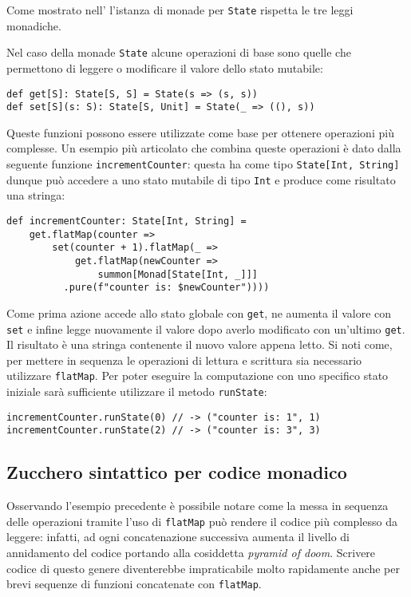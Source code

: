 Come mostrato nell' l'istanza di monade per \lstinline{State} rispetta le tre leggi monadiche.

Nel caso della monade \lstinline{State} alcune operazioni di base sono quelle che permettono di leggere o modificare il valore dello stato mutabile:
\begin{lstlisting}[language=scala3]
def get[S]: State[S, S] = State(s => (s, s))  
def set[S](s: S): State[S, Unit] = State(_ => ((), s))
\end{lstlisting}
Queste funzioni possono essere utilizzate come base per ottenere operazioni più complesse. Un esempio più articolato che combina queste operazioni è dato dalla seguente funzione \lstinline{incrementCounter}: questa ha come tipo \lstinline{State[Int, String]} dunque può accedere a uno stato mutabile di tipo \lstinline{Int} e produce come risultato una stringa:
\begin{lstlisting}[language=scala3]
def incrementCounter: State[Int, String] =
	get.flatMap(counter => 
		set(counter + 1).flatMap(_ =>
			get.flatMap(newCounter => 
				summon[Monad[State[Int, _]]]
          .pure(f"counter is: $newCounter"))))
\end{lstlisting}
Come prima azione accede allo stato globale con \lstinline{get}, ne aumenta il valore con \lstinline{set} e infine legge nuovamente il valore dopo averlo modificato con un'ultimo \lstinline{get}. Il risultato è una stringa contenente il nuovo valore appena letto.
Si noti come, per mettere in sequenza le operazioni di lettura e scrittura sia necessario utilizzare \lstinline{flatMap}. Per poter eseguire la computazione con uno specifico stato iniziale sarà sufficiente utilizzare il metodo \lstinline{runState}:
\begin{lstlisting}[language=scala3]
incrementCounter.runState(0) // -> ("counter is: 1", 1)
incrementCounter.runState(2) // -> ("counter is: 3", 3)
\end{lstlisting}

\subsection{Zucchero sintattico per codice monadico}
Osservando l'esempio precedente è possibile notare come la messa in sequenza delle operazioni tramite l'uso di \lstinline{flatMap} può rendere il codice più complesso da leggere: infatti, ad ogni concatenazione successiva aumenta il livello di annidamento del codice portando alla cosiddetta \emph{pyramid of doom}.
Scrivere codice di questo genere diventerebbe impraticabile molto rapidamente anche per brevi sequenze di funzioni concatenate con \lstinline{flatMap}.

